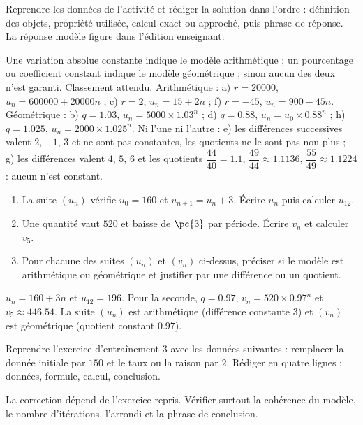 \begin{example}
Reprendre les données de l'activité et rédiger la solution dans l'ordre : définition des objets, propriété utilisée, calcul exact ou approché, puis phrase de réponse. La réponse modèle figure dans l'édition enseignant.
\end{example}
\begin{solution}Une variation absolue constante indique le modèle arithmétique ; un pourcentage ou coefficient constant indique le modèle géométrique ; sinon aucun des deux n'est garanti. Classement attendu. Arithmétique : a) $r=\num{20000}$, $u_n=\num{600000}+\num{20000}n$ ; c) $r=2$, $u_n=15+2n$ ; f) $r=-45$, $u_n=900-45n$. Géométrique : b) $q=\num{1,03}$, $u_n=\num{5000}\times\num{1,03}^n$ ; d) $q=\num{0,88}$, $u_n=u_0\times\num{0,88}^n$ ; h) $q=\num{1,025}$, $u_n=\num{2000}\times\num{1,025}^n$. Ni l'une ni l'autre : e) les différences successives valent $2$, $-1$, $3$ et ne sont pas constantes, les quotients ne le sont pas non plus ; g) les différences valent $4$, $5$, $6$ et les quotients $\dfrac{44}{40}=\num{1,1}$, $\dfrac{49}{44}\approx\num{1,1136}$, $\dfrac{55}{49}\approx\num{1,1224}$ : aucun n'est constant.\end{solution}

\begin{exercise}[essentiel]
\begin{enumerate}\item La suite $(u_n)$ vérifie $u_0=160$ et $u_{n+1}=u_n+3$. Écrire $u_n$ puis calculer $u_{12}$.\item Une quantité vaut $520$ et baisse de $\pc{3}$ par période. Écrire $v_n$ et calculer $v_5$.\item Pour chacune des suites $(u_n)$ et $(v_n)$ ci-dessus, préciser si le modèle est arithmétique ou géométrique et justifier par une différence ou un quotient.\end{enumerate}
\end{exercise}
\begin{solution}$u_n=160+3n$ et $u_{12}=196$. Pour la seconde, $q=\num{0,97}$, $v_n=520\times\num{0,97}^n$ et $v_5\approx\num{446,54}$. La suite $(u_n)$ est arithmétique (différence constante $3$) et $(v_n)$ est géométrique (quotient constant $\num{0,97}$).\end{solution}


\begin{homework}Reprendre l'exercice d'entraînement 3 avec les données suivantes : remplacer la donnée initiale par $150$ et le taux ou la raison par $2$. Rédiger en quatre lignes : données, formule, calcul, conclusion.\end{homework}
\begin{solution}La correction dépend de l'exercice repris. Vérifier surtout la cohérence du modèle, le nombre d'itérations, l'arrondi et la phrase de conclusion.\end{solution}

